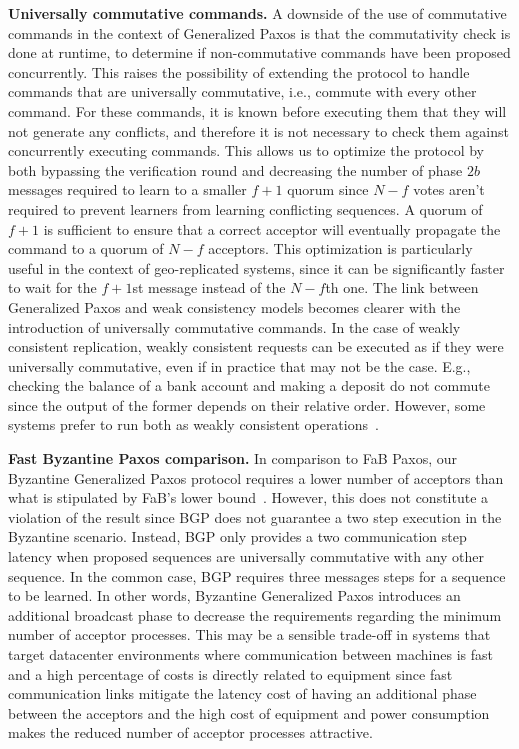 \noindent \textbf{Universally commutative commands.}
A downside of the use of commutative commands in the
context of Generalized Paxos is that the commutativity check is done
at runtime, to determine if non-commutative commands have
been proposed concurrently.
This raises the possibility of extending the protocol to handle
commands that are universally commutative, i.e., commute with every
other command. For these commands, it is known before executing them
that they will not generate any conflicts, and therefore it is not
necessary to check them against concurrently executing commands.  This allows us to optimize the protocol by both bypassing the verification round and decreasing the number of phase $2b$ messages required to learn to a smaller $f+1$ quorum since $N-f$ votes aren't required to prevent learners from learning conflicting sequences. A quorum of $f+1$ is sufficient to
ensure that a correct acceptor will eventually
propagate the command to a quorum of $N-f$ acceptors. This optimization is particularly useful in the context of 
geo-replicated systems, since it can be significantly faster to wait for the $f+1$st message instead of the $N-f$th one. 
The link between Generalized Paxos and weak consistency models  becomes clearer with the introduction of universally commutative commands. In the case of weakly consistent replication, weakly consistent requests can be executed as if they were universally commutative, even if in practice that may not be the case. E.g., checking the balance of a bank account and making a deposit do not commute since the output of the former depends on their relative order. However, some systems prefer to run both as weakly consistent operations~\cite{Li2012}.  \par
\noindent \textbf{Fast Byzantine Paxos comparison.}
In comparison to FaB Paxos, our Byzantine Generalized Paxos protocol requires a lower number of acceptors than what is stipulated by FaB's lower bound~\cite{Martin2006}. However, this does not constitute a violation of the result since BGP does not guarantee a two step execution in the Byzantine scenario. Instead, BGP only provides a two communication step latency when proposed sequences are universally commutative with any other sequence. In the common case, BGP requires three messages steps for a sequence to be learned. In other words, Byzantine Generalized Paxos introduces an additional broadcast phase to decrease the requirements regarding the minimum number of acceptor processes. This may be a sensible trade-off in systems that target datacenter environments where communication between machines is fast and a high percentage of costs is directly related to equipment since fast communication links mitigate the latency cost of having an additional phase between the acceptors and the high cost of equipment and power consumption makes the reduced number of acceptor processes attractive.